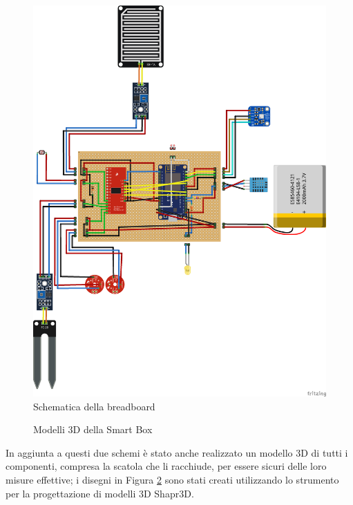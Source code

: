 \documentclass[fleqn, 10pt]{SelfArx}
\begin{document}
\begin{figure}[htb]
\centering
\includegraphics[scale=0.25]{hardware/iot_project_bb.png}
\caption{Schematica della breadboard}
\label{fig:breadboard}
\end{figure}

\begin{figure}[htb]
  \centering
  \caption{Modelli 3D della Smart Box}
  \label{fig:models}
\end{figure}

In aggiunta a questi due schemi è stato anche realizzato un modello 3D di tutti i componenti, compresa la scatola che li racchiude, per essere sicuri delle loro misure effettive; 
i disegni in Figura \ref{fig:models} sono stati creati utilizzando lo strumento per la progettazione di modelli 3D Shapr3D\cite{shapr3d}. 
\end{document}
